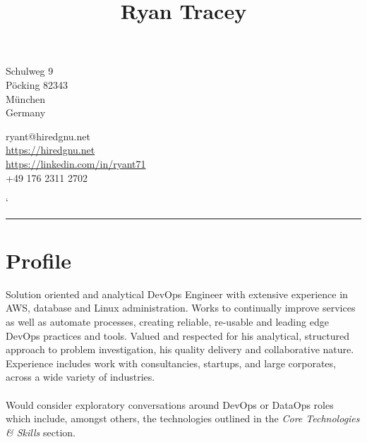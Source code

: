\documentclass[10pt]{article}
\title{\bfseries\huge Ryan Tracey}
\author{}
\date{}
\begin{document}
\maketitle
\begin{minipage}[ht]{0.48\textwidth}
Schulweg 9\\
Pöcking 82343\\
München\\
Germany
\end{minipage}
\begin{minipage}[ht]{0.48\textwidth}
\hspace{5pt}ryant@hiredgnu.net\\
\hspace{5pt}\url{https://hiredgnu.net}\\
\hspace{5pt}\url{https://linkedin.com/in/ryant71}\\
\Mobilefone\hspace{5pt}+49 176 2311 2702\\
\color{red}{\Bat}\hspace{2pt}\male
\end{minipage}
`\vspace{20pt}
\hrule
\vspace{10pt}
\section*{Profile}
Solution oriented and analytical DevOps Engineer with extensive experience in AWS, database and Linux administration. Works to continually improve services as well as automate processes, creating reliable, re-usable and leading edge DevOps practices and tools.
Valued and respected for his analytical, structured approach to problem investigation, his quality delivery and collaborative nature.  Experience includes work with consultancies, startups, and large corporates, across a wide variety of industries.\\\\
Would consider exploratory conversations around DevOps or DataOps roles which include, amongst others, the technologies outlined in the \textit{Core Technologies  \& Skills} section.
\end{document}
